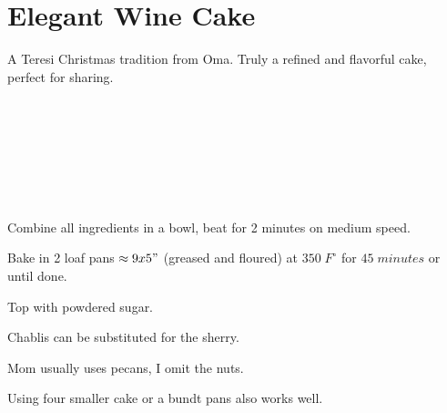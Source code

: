 \section{Elegant Wine Cake}

\begin{recipestats}[
	servings=2 loafs,
	source=Lucille Steinmiller (Oma),
	]
\end{recipestats}

\begin{recipeabstract}
	A Teresi Christmas tradition from Oma.
	Truly a refined and flavorful cake, perfect for sharing.
\end{recipeabstract}

\begin{ingredientcolumns}[1]
	\begin{ingredientblock}
		\\
		\\
		\\
		\\
		\\
		\\
	\end{ingredientblock}
\end{ingredientcolumns}


\begin{preparation}
\item Combine all ingredients in a bowl, beat for 2 minutes on medium speed.
\item Bake in 2 loaf pans $\approx 9x5"$ (greased and floured) at $350\; F^\circ$ for $45\; minutes$ or until done.
\item Top with powdered sugar.
\end{preparation}

\begin{variation}
\item Chablis can be substituted for the sherry.
\item Mom usually uses pecans, I  omit the nuts.
\item Using four smaller cake or a bundt pans also works well.
\end{variation}

\recipeend
